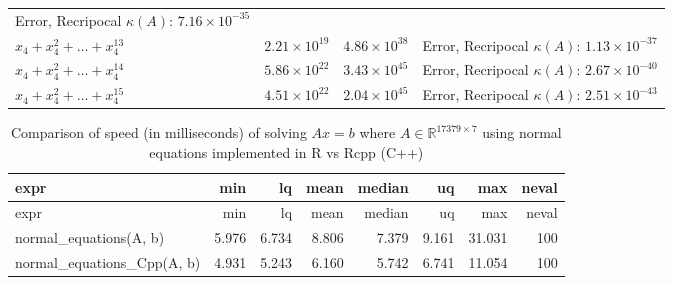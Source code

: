 \documentclass[
]{article}
\begin{document}
\begin{longtable}[]{@{}llll@{}}
\begin{minipage}[t]{0.36\columnwidth}
Error, Recripocal \(\kappa(A)\): \(7.16 \times 10^{-35}\)\strut
\end{minipage}\tabularnewline
\begin{minipage}[t]{0.23\columnwidth}\raggedright
\(x_{4}+x_{4}^{2}+\dots+x_{4}^{13}\)\strut
\end{minipage} & \begin{minipage}[t]{0.15\columnwidth}\raggedright
\(2.21 \times 10^{19}\)\strut
\end{minipage} & \begin{minipage}[t]{0.15\columnwidth}\raggedright
\(4.86 \times 10^{38}\)\strut
\end{minipage} & \begin{minipage}[t]{0.36\columnwidth}\raggedright
Error, Recripocal \(\kappa(A)\): \(1.13 \times 10^{-37}\)\strut
\end{minipage}\tabularnewline
\begin{minipage}[t]{0.23\columnwidth}\raggedright
\(x_{4}+x_{4}^{2}+\dots+x_{4}^{14}\)\strut
\end{minipage} & \begin{minipage}[t]{0.15\columnwidth}\raggedright
\(5.86 \times 10^{22}\)\strut
\end{minipage} & \begin{minipage}[t]{0.15\columnwidth}\raggedright
\(3.43 \times 10^{45}\)\strut
\end{minipage} & \begin{minipage}[t]{0.36\columnwidth}\raggedright
Error, Recripocal \(\kappa(A)\): \(2.67 \times 10^{-40}\)\strut
\end{minipage}\tabularnewline
\begin{minipage}[t]{0.23\columnwidth}\raggedright
\(x_{4}+x_{4}^{2}+\dots+x_{4}^{15}\)\strut
\end{minipage} & \begin{minipage}[t]{0.15\columnwidth}\raggedright
\(4.51 \times 10^{22}\)\strut
\end{minipage} & \begin{minipage}[t]{0.15\columnwidth}\raggedright
\(2.04 \times 10^{45}\)\strut
\end{minipage} & \begin{minipage}[t]{0.36\columnwidth}\raggedright
Error, Recripocal \(\kappa(A)\): \(2.51 \times 10^{-43}\)\strut
\end{minipage}\tabularnewline
\bottomrule
\end{longtable}

\begin{longtable}[]{@{}lrrrrrrr@{}}
\caption{Comparison of speed (in milliseconds) of solving \(Ax = b\)
where \(A \in \mathbb{R}^{17379 \times 7}\) using normal equations
implemented in R vs Rcpp (C++)}\tabularnewline
\toprule
expr & min & lq & mean & median & uq & max & neval\tabularnewline
\midrule
\endfirsthead
\toprule
expr & min & lq & mean & median & uq & max & neval\tabularnewline
\midrule
\endhead
normal\_equations(A, b) & 5.976 & 6.734 & 8.806 & 7.379 & 9.161 & 31.031
& 100\tabularnewline
normal\_equations\_Cpp(A, b) & 4.931 & 5.243 & 6.160 & 5.742 & 6.741 &
11.054 & 100\tabularnewline
\bottomrule
\end{longtable}
\end{document}
